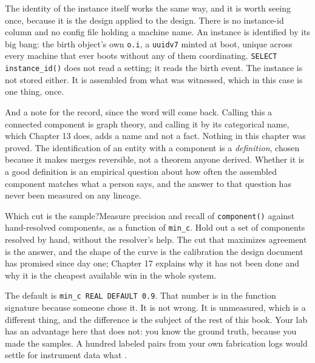 The identity of the instance itself works the same way, and it is worth seeing once, because it is the design applied to the design. There is no instance-id column and no config file holding a machine name. An instance is identified by its big bang: the birth object's own \texttt{o.i}, a \texttt{uuidv7} minted at boot, unique across every machine that ever boots without any of them coordinating. \texttt{SELECT instance\_id()} does not read a setting; it reads the birth event. The instance is not stored either. It is assembled from what was witnessed, which in this case is one thing, once.

And a note for the record, since the word will come back. Calling this a connected component is graph theory, and calling it by its categorical name, which Chapter 13 does, adds a name and not a fact. Nothing in this chapter was proved. The identification of an entity with a component is a \emph{definition}, chosen because it makes merges reversible, not a theorem anyone derived. Whether it is a good definition is an empirical question about how often the assembled component matches what a person says, and the answer to that question has never been measured on any lineage.

\begin{Open}{Which cut is the sample?}{Measure precision and recall of \texttt{component()} against hand-resolved components, as a function of \texttt{min\_c}.}
Hold out a set of components resolved by hand, without the resolver's help. The cut that maximizes agreement is the answer, and the shape of the curve is the calibration the design document has promised since day one; Chapter 17 explains why it has not been done and why it is the cheapest available win in the whole system.

The default is \texttt{min\_c REAL DEFAULT 0.9}. That number is in the function signature because someone chose it. It is not wrong. It is unmeasured, which is a different thing, and the difference is the subject of the rest of this book. Your lab has an advantage here that \labLineage{} does not: you know the ground truth, because you made the samples. A hundred labeled pairs from your own fabrication logs would settle for instrument data what \labLineageContrast.
\end{Open}
